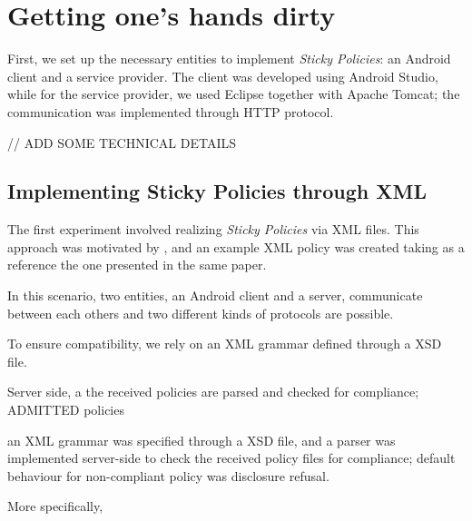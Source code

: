 \chapter{Getting one's hands dirty}
\label{chapter3}
\thispagestyle{empty}

\noindent First, we set up the necessary entities to implement \textit{Sticky Policies}: an Android client and a service provider. The client was developed using Android Studio, while for the service provider, we used Eclipse together with Apache Tomcat; the communication was implemented through HTTP protocol.

// ADD SOME TECHNICAL DETAILS

\section{Implementing Sticky Policies through XML}
The first experiment involved realizing \textit{Sticky Policies} via XML files. This approach was motivated by \cite{mont2003towards}, and an example XML policy was created taking as a reference the one presented in the same paper.

In this scenario, two entities, an Android client and a server, communicate between each others and two different kinds of protocols are possible. 

To ensure compatibility, we rely on an XML grammar defined through a XSD file.

Server side, a the received policies are parsed and checked for compliance; ADMITTED policies

 an XML grammar was specified through a XSD file, and a parser was implemented server-side to check the received policy files for compliance; default behaviour for non-compliant policy was disclosure refusal.

More specifically,